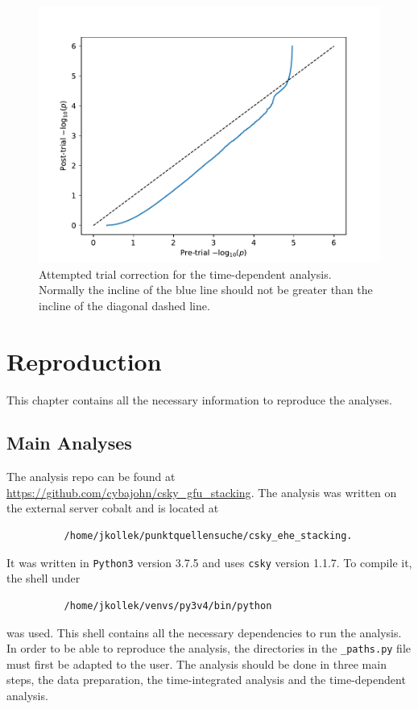 \begin{figure}
    \centering
    \includegraphics[width=\linewidth]{Plots/appendix/post_trial_p_values_1.pdf}
    \caption{Attempted trial correction for the time-dependent analysis. Normally the incline of the blue line should not be greater than the incline of the diagonal dashed line.}
    \label{fig:post_trials}
\end{figure}

\chapter{Reproduction}

This chapter contains all the necessary information to reproduce the analyses.

\section{Main Analyses}

The analysis repo can be found at \url{https://github.com/cybajohn/csky_gfu_stacking}.
The analysis was written on the external server cobalt and is located at
\begin{verbatim}
          /home/jkollek/punktquellensuche/csky_ehe_stacking.
\end{verbatim}
It was written in \texttt{Python3} version 3.7.5 and uses \texttt{csky} version 1.1.7.
To compile it, the shell under
\begin{verbatim}
          /home/jkollek/venvs/py3v4/bin/python
\end{verbatim}
was used.
This shell contains all the necessary dependencies to run the analysis.
In order to be able to reproduce the analysis, the directories in the \texttt{\_paths.py} file must first be adapted to the user.
The analysis should be done in three main steps, the data preparation, the time-integrated analysis and the time-dependent analysis.


